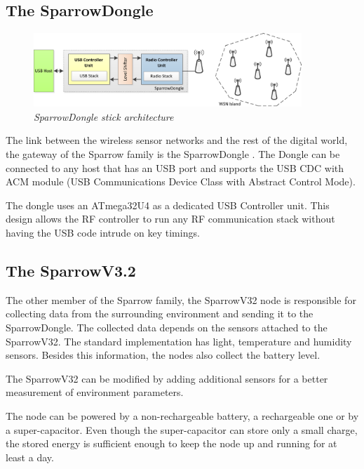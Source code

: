 \subsection{The SparrowDongle}

\begin{figure}[ht]
\begin{center}
\includegraphics[width=0.9\textwidth]{img/donge_architecture.png}
\end{center}
\caption{\small \itshape{SparrowDongle stick architecture}\cite{voinescu2013lightweight}}
\end{figure}
 
The link between the wireless sensor networks and the rest of the digital world, the gateway of the Sparrow family is the SparrowDongle . The Dongle can be connected to any host that has an USB port and supports the USB CDC with ACM module (USB Communications Device Class with Abstract Control Mode). 

The dongle uses an ATmega32U4 as a dedicated USB Controller unit. This design allows the RF controller to run any RF communication stack without having the USB code intrude on key timings.\cite{voinescu2013lightweight}


\subsection{The SparrowV3.2}
 
 
The other member of the Sparrow family, the SparrowV32 node is responsible for collecting data from the surrounding environment and sending it to the SparrowDongle. The collected data depends on the sensors attached to the SparrowV32. The standard implementation has light, temperature and humidity sensors. Besides this information, the nodes also collect the battery level.

The SparrowV32 can be modified by adding additional sensors for a better measurement of environment parameters.

The node can be powered by a non-rechargeable battery, a rechargeable one or by a super-capacitor. Even though the super-capacitor can store only a small charge, the stored energy is sufficient enough to keep the node up and running for at least a day.

